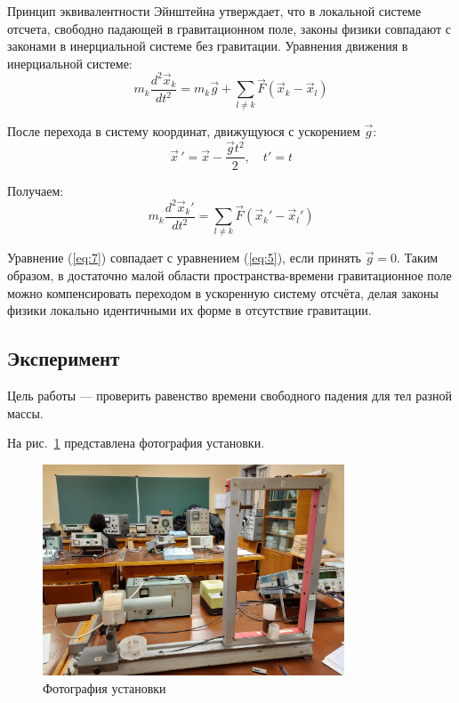 Принцип эквивалентности Эйнштейна утверждает, что в локальной системе отсчета, свободно падающей в гравитационном поле, законы физики совпадают с законами в инерциальной системе без гравитации. Уравнения движения в инерциальной системе:
\begin{equation}
\label{eq:5}
   m_k \frac{d^2\vec{x}_k}{dt^2} = m_k \vec{g} + \sum_{l \neq k} \vec{F}(\vec{x}_k - \vec{x}_l)
\end{equation}

После перехода в систему координат, движущуюся с ускорением $\vec{g}$:
\begin{equation}
\label{eq:6}
   \vec{x}\,' = \vec{x} - \frac{\vec{g}t^2}{2}, \quad t' = t
\end{equation}

Получаем:
\begin{equation}
\label{eq:7}
   m_k \frac{d^2\vec{x}_k'}{dt^2} = \sum_{l \neq k} \vec{F}(\vec{x}_k' - \vec{x}_l')
\end{equation}

Уравнение (\ref{eq:7}) совпадает с уравнением (\ref{eq:5}), если принять $\vec{g} = 0$. Таким образом, в достаточно малой области пространства-времени гравитационное поле можно компенсировать переходом в ускоренную систему отсчёта, делая законы физики локально идентичными их форме в отсутствие гравитации.

\subsection{Эксперимент}

Цель работы — проверить равенство времени свободного падения для тел разной массы.

На рис.~\ref{fig:photo} представлена фотография установки.

\begin{figure}[H]
\centering
\includegraphics[width=0.8\textwidth]{photo.jpg}
\caption{Фотография установки}
\label{fig:photo}
\end{figure}

